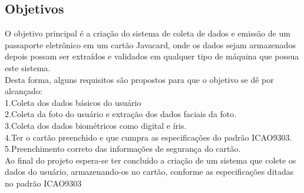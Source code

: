 \documentclass{article}
\begin{document}
	\subsection{Objetivos}
		\begin{justify}
				
				\hspace{2cm}O objetivo principal é a criação do sistema de coleta de dados e emissão de um passaporte eletrônico em um cartão Javacard, onde os dados sejam armazenados depois possam ser extraídos e validados em qualquer tipo de máquina que possua este sistema.\\
				\hspace*{2cm}Desta forma, alguns requisitos são propostos para que o objetivo se dê por alcançado:\\
					\hspace*{3cm}1.Coleta dos dados básicos do usuário\\
					\hspace*{3cm}2.Coleta da foto do usuário e extração dos dados faciais da foto.\\
					\hspace*{3cm}3.Coleta dos dados biométricos como digital e íris.\\
					\hspace*{3cm}4.Ter o cartão preenchido e que cumpra as especificações do padrão ICAO9303.\\
					\hspace*{3cm}5.Preenchimento correto das informações de segurança do cartão.\\
				 \hspace*{2cm}Ao final do projeto espera-se ter concluído a criação de um sistema que colete os dados do usuário, armazenando-os no cartão, conforme as especificações ditadas no padrão ICAO9303

			
		\end{justify}
\end{document}
